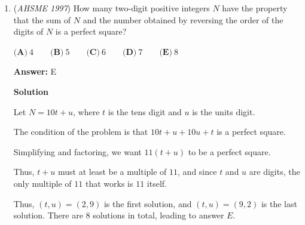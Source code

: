 \begin{enumerate}
 $y = -x - 78$ will hit $(19, -97)$, so $D$ is possible.

 By process of elimination, $\boxed{E}$ must be impossible.  Plugging in the point $(1997,0)$ into $y = mx + b$ will give $0 = 1997m + b$, or $b = -1997m$.  Thus, $m$ and $b$ must be of opposite signs.

 



\textbf{Solution 3}

Plugging in $(0,1997)$ into $y = mx + b$ gives $1997 = 0m + b$.  Thus, $b$ is positive, and $m$ can be anything, so $m$ can be positive too.

 Plugging in $(0, -1997)$ into $y = mx + b$ gives $-1997 = 0m + b$.  Thus, $b$ is negative, and $m$ can be anything, so $m$ can be negative too.

 Plugging in $(19,97)$ into $y = mx + b$ gives $97 = 19m + b$.  Examining this shows $m$ and $b$ can both be positive.

 Plugging in $(19,-97)$ into $y = mx + b$ gives $-97 = 19m + b$.  Examining this shows $m$ and $b$ can both be negative.

 Plugging in $(1997,0)$ into $y = mx + b$ gives $0 = 1997m + b$.  Examining this shows exactly one of $m$ or $b$ can be positive - the other must be negative.  Thus, the answer is $\boxed{E}$.

 


	\item (\textit{AHSME 1997}) How many two-digit positive integers $N$ have the property that the sum of $N$ and the number obtained by reversing the order of the digits of $N$ is a perfect square?


 $\textbf{(A)}\ 4\qquad\textbf{(B)}\ 5\qquad\textbf{(C)}\ 6\qquad\textbf{(D)}\ 7\qquad\textbf{(E)}\ 8$

 \textbf{Answer: }E



\textbf{Solution}

Let $N = 10t + u$, where $t$ is the tens digit and $u$ is the units digit.

 The condition of the problem is that $10t + u + 10u + t$ is a perfect square.

 Simplifying and factoring, we want $11(t+u)$ to be a perfect square.

 Thus, $t+u$ must at least be a multiple of $11$, and since $t$ and $u$ are digits, the only multiple of $11$ that works is $11$ itself.

 Thus, $(t,u) = (2,9)$ is the first solution, and $(t,u) = (9,2)$ is the last solution.  There are $8$ solutions in total, leading to answer $\boxed{E}$.


\end{enumerate}
